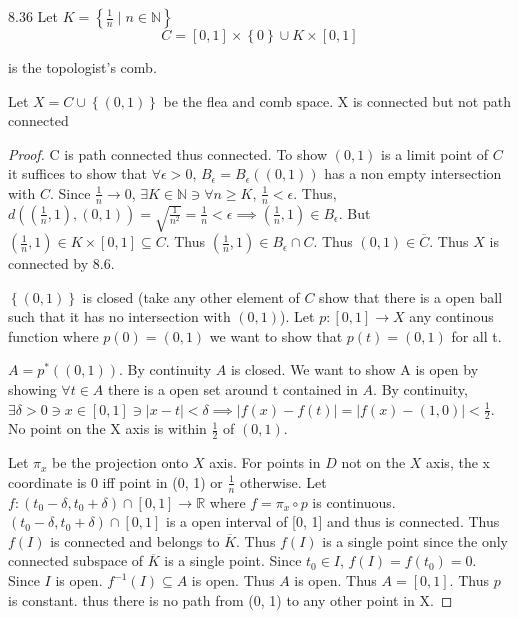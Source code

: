 \documentclass{article}
\newcommand*{\subeq}{\subseteq}
\newcommand{\R}{\mathbb{R}}
\newcommand{\N}{\mathbb{N}}
\newcommand{\abs}[1]{\left\lvert #1\right\rvert}
\begin{document}
\begin{PROB}{8.36}\label{Problem 8.36.}
    Let $K = \left\{ \frac{1}{n} \mid n \in \N \right\}$ 
    \[
    C = [0, 1] \times \left\{ 0 \right\} \cup K \times [0, 1]
    \]

    is the topologist's comb. 

    Let $X = C \cup \left\{ (0, 1) \right\}$ be the flea and comb space. X is connected but not path connected
\end{PROB}
\begin{proof}
    C is path connected thus connected. To show $(0, 1)$ is a limit point of $C$ it suffices to show that $\forall \epsilon > 0$, $B_\epsilon = B_\epsilon((0, 1)) $ has a non empty intersection with $C$. Since $\frac{1}{n}\to 0$, $\exists K \in \N \ni \forall n \geq K$, $\frac{1}{n} < \epsilon$. Thus, $d(\left(\frac{1}{n}, 1\right), (0, 1)) = \sqrt{\frac{1}{n^2}} = \frac{1}{n} < \epsilon \implies (\frac{1}{n}, 1) \in B_\epsilon$. But $(\frac{1}{n}, 1) \in K \times [0, 1] \subeq C$. Thus $(\frac{1}{n}, 1) \in B_\epsilon \cap C$. Thus $(0, 1)\in \overline{C}$. Thus $X$ is connected by 8.6. 
    
    $\left\{ (0, 1) \right\}$ is closed (take any other element of $C$ show that there is a open ball such that it has no intersection with $(0, 1)$). Let $p: [0,1] \to X$ any continous function where $p(0) = (0, 1)$ we want to show that $p(t) = (0, 1)$ for all t.
    
    $A = p^*((0, 1))$. By continuity $A$ is closed. 
    We want to show A is open by showing $\forall t \in A$ there is a open set around t contained in $A$. By continuity, $\exists \delta > 0 \ni x \in [0, 1] \ni \abs{x - t} < \delta \implies \abs{f(x) - f(t)} = \abs{f(x) - (1, 0)} < \frac{1}{2}$. No point on the X axis is within $\frac{1}{2}$ of $(0, 1)$. 
    
    Let $\pi_x$ be the projection onto $X$ axis. For points in $D$ not on the $X$ axis, the x coordinate is 0 iff point in (0, 1) or $\frac{1}{n}$ otherwise. Let $f: (t_0 - \delta, t_0 + \delta) \cap [0, 1] \to \R$ where $f = \pi_x \circ p$ is continuous. $(t_0 - \delta, t_0 + \delta) \cap [0, 1]$ is a open interval of [0, 1] and thus is connected. Thus $f(I)$ is connected and belongs to $\overline{K}$. Thus $f(I)$ is a single point since the only connected subspace of $\overline{K}$ is a single point. Since $t_0 \in I$, $f(I) = f(t_0) = 0$. Since $I$ is open. $f^{-1}(I) \subeq A$ is open. Thus $A$ is open. Thus $A = [0, 1]$. Thus $p$ is constant. thus there is no path from (0, 1) to any other point in X.                     
\end{proof}
\end{document}
